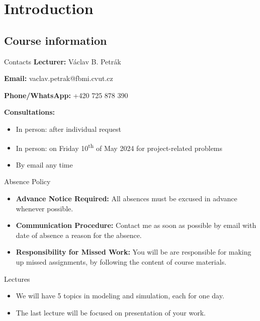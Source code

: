 \section{Introduction}
\subsection{Course information}
\begin{frame}{Contacts}
    \textbf{Lecturer:} Václav B. Petrák  

    \textbf{Email:} vaclav.petrak@fbmi.cvut.cz  

    \textbf{Phone/WhatsApp:} +420 725 878 390

    \vspace{1em}
    \textbf{Consultations:} 
    \begin{itemize}
        \item In person: after individual request
        \item In person: on Friday 10\textsuperscript{th} of May 2024 for project-related problems
        \item By email any time
    \end{itemize}

\end{frame}

\begin{frame}{Absence Policy}


\begin{itemize}
    \item \textbf{Advance Notice Required:} All absences must be excused in advance whenever possible.

    \item \textbf{Communication Procedure:}  Contact me  as soon as possible by email with date of absence a reason for the absence.

    \item \textbf{Responsibility for Missed Work:} You will be are responsible for making up missed assignments, by following the content of course materials.  
\end{itemize}
 

\end{frame}


\begin{frame}{Lectures}
\Large
\begin{itemize}
    \item We will have 5 topics in modeling and simulation, each for one day.
    \item The last lecture will be focused on presentation of your work. 
\end{itemize}
\end{frame}

